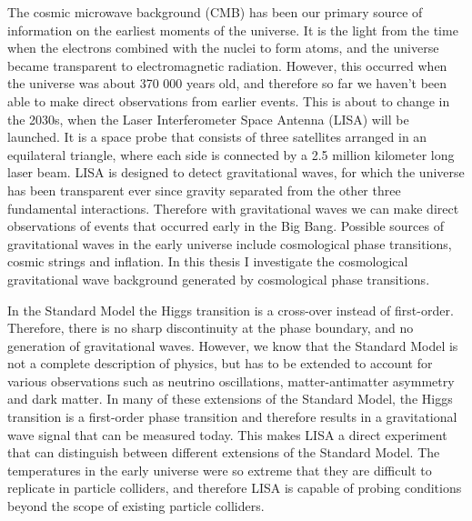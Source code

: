\iffalse
Raise the interest of the reader!

Tip for style: discuss the same things from another point of view (in the light of the results) in the conclusion.
-> Binds the thesis together.

\begin{itemize}
    \item Background for the choice of theme
    \item A discussion of the research question or thesis statement
    \item A schematic outline of the thesis
\end{itemize}

Research question: how to simulate the gravitational spectra caused by different equations of state with PTtools?
\fi

The cosmic microwave background (CMB) has been our primary source of information on the earliest moments of the universe.
It is the light from the time when the electrons combined with the nuclei to form atoms,
and the universe became transparent to electromagnetic radiation.
However, this occurred when the universe was about 370 000 years old,
and therefore so far we haven't been able to make direct observations from earlier events.
This is about to change in the 2030s, when the Laser Interferometer Space Antenna (LISA) will be launched.
It is a space probe that consists of three satellites arranged in an equilateral triangle, where each side is connected by a 2.5 million kilometer long laser beam.
LISA is designed to detect gravitational waves,
for which the universe has been transparent ever since gravity separated from the other three fundamental interactions.
Therefore with gravitational waves we can make direct observations of events that occurred early in the Big Bang.
Possible sources of gravitational waves in the early universe include cosmological phase transitions, cosmic strings and inflation.
In this thesis I investigate the cosmological gravitational wave background generated by cosmological phase transitions.
\cites{lecture_notes}{lisa_2017}

In the Standard Model the Higgs transition is a cross-over instead of first-order.
Therefore, there is no sharp discontinuity at the phase boundary, and no generation of gravitational waves.
However, we know that the Standard Model is not a complete description of physics,
but has to be extended to account for various observations such as neutrino oscillations, matter-antimatter asymmetry and dark matter.
In many of these extensions of the Standard Model, the Higgs transition is a first-order phase transition
and therefore results in a gravitational wave signal that can be measured today.
This makes LISA a direct experiment that can distinguish between different extensions of the Standard Model.
The temperatures in the early universe were so extreme that they are difficult to replicate in particle colliders,
and therefore LISA is capable of probing conditions beyond the scope of existing particle colliders.
\cite{lecture_notes}


